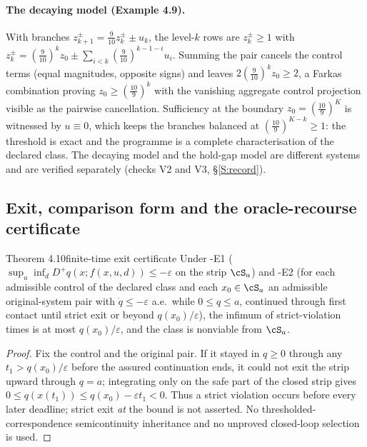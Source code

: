 \paragraph{The decaying model (Example 4.9).} With branches $z^\pm_{k+1}=\tfrac9{10}z^\pm_k\pm u_k$, the level-$k$ rows are $z^\pm_k\ge1$ with $z^\pm_k=(\tfrac9{10})^kz_0\pm\sum_{i<k}(\tfrac9{10})^{k-1-i}u_i$. Summing the pair cancels the control terms (equal magnitudes, opposite signs) and leaves $2(\tfrac9{10})^kz_0\ge2$, a Farkas combination proving $z_0\ge(\tfrac{10}9)^k$ with the vanishing aggregate control projection visible as the pairwise cancellation. Sufficiency at the boundary $z_0=(\tfrac{10}9)^K$ is witnessed by $u\equiv0$, which keeps the branches balanced at $(\tfrac{10}9)^{K-k}\ge1$: the threshold is exact and the programme is a complete characterisation of the declared class. The decaying model and the hold-gap model are different systems and are verified separately (checks V2 and V3, \S\ref{S:record}).

\subsection{Exit, comparison form and the oracle-recourse certificate}\label{S:recourse}

\begin{restated}{Theorem 4.10}{finite-time exit certificate}
Under \hyp{E1} ($\sup_{u}\inf_dD^+q(x;f(x,u,d))\le-\varepsilon$ on the strip $\cS_a$) and \hyp{E2} (for each admissible control of the declared class and each $x_0\in\cS_a$ an admissible original-system pair with $\dot q\le-\varepsilon$ a.e.\ while $0\le q\le a$, continued through first contact until strict exit or beyond $q(x_0)/\varepsilon$), the infimum of strict-violation times is at most $q(x_0)/\varepsilon$, and the class is nonviable from $\cS_a$.
\end{restated}

\begin{proof}
Fix the control and the original pair. If it stayed in $q\ge0$ through any $t_1>q(x_0)/\varepsilon$ before the assured continuation ends, it could not exit the strip upward through $q=a$; integrating only on the safe part of the closed strip gives $0\le q(x(t_1))\le q(x_0)-\varepsilon t_1<0$. Thus a strict violation occurs before every later deadline; strict exit \emph{at} the bound is not asserted. No thresholded-correspondence semicontinuity inheritance and no unproved closed-loop selection is used.
\end{proof}

